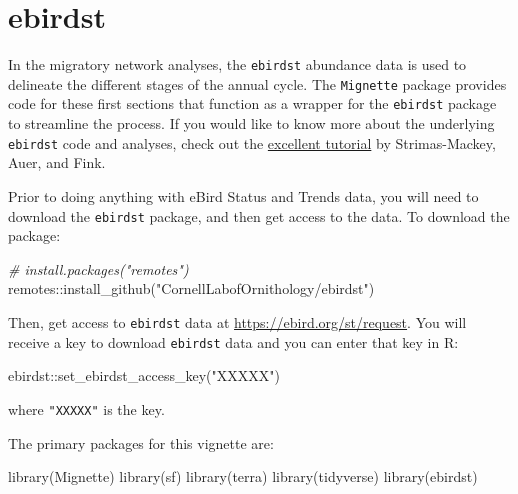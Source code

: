 \documentclass[
]{book}
\newenvironment{Shaded}{\begin{snugshade}}{\end{snugshade}}
\newcommand{\CommentTok}[1]{\textcolor[rgb]{0.56,0.35,0.01}{\textit{#1}}}
\newcommand{\FunctionTok}[1]{\textcolor[rgb]{0.00,0.00,0.00}{#1}}
\newcommand{\NormalTok}[1]{#1}
\newcommand{\SpecialCharTok}[1]{\textcolor[rgb]{0.00,0.00,0.00}{#1}}
\newcommand{\StringTok}[1]{\textcolor[rgb]{0.31,0.60,0.02}{#1}}
\begin{document}
\hypertarget{ebirdst}{%
\section{ebirdst}\label{ebirdst}}

In the migratory network analyses, the \texttt{ebirdst} abundance data is used to delineate the different stages of the annual cycle. The \texttt{Mignette} package provides code for these first sections that function as a wrapper for the \texttt{ebirdst} package to streamline the process. If you would like to know more about the underlying \texttt{ebirdst} code and analyses, check out the \href{https://cornelllabofornithology.github.io/ebirdst/articles/ebirdst-advanced-mapping.html}{excellent tutorial} by Strimas-Mackey, Auer, and Fink.

Prior to doing anything with eBird Status and Trends data, you will need to download the \texttt{ebirdst} package, and then get access to the data. To download the package:

\begin{Shaded}
\begin{Highlighting}[]
\CommentTok{\# install.packages("remotes")}
\NormalTok{remotes}\SpecialCharTok{::}\FunctionTok{install\_github}\NormalTok{(}\StringTok{"CornellLabofOrnithology/ebirdst"}\NormalTok{)}
\end{Highlighting}
\end{Shaded}

Then, get access to \texttt{ebirdst} data at \url{https://ebird.org/st/request}. You will receive a key to download \texttt{ebirdst} data and you can enter that key in R:

\begin{Shaded}
\begin{Highlighting}[]
\NormalTok{ebirdst}\SpecialCharTok{::}\FunctionTok{set\_ebirdst\_access\_key}\NormalTok{(}\StringTok{"XXXXX"}\NormalTok{)}
\end{Highlighting}
\end{Shaded}

where \texttt{"XXXXX"} is the key.

The primary packages for this vignette are:

\begin{Shaded}
\begin{Highlighting}[]
\FunctionTok{library}\NormalTok{(Mignette)}
\FunctionTok{library}\NormalTok{(sf)}
\FunctionTok{library}\NormalTok{(terra)}
\FunctionTok{library}\NormalTok{(tidyverse)}
\FunctionTok{library}\NormalTok{(ebirdst)}
\end{Highlighting}
\end{Shaded}
\end{document}
